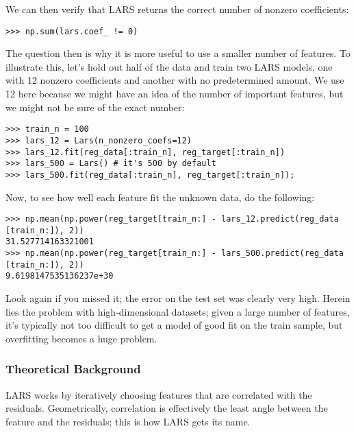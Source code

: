 \documentclass[SKL-MASTER.tex]{subfiles}
\begin{document}
We can then verify that LARS returns the correct number of nonzero coefficients:
\begin{framed}
	\begin{verbatim}
>>> np.sum(lars.coef_ != 0)
\end{verbatim}
\end{framed}
The question then is why it is more useful to use a smaller number of features. To illustrate
this, let's hold out half of the data and train two LARS models, one with 12 nonzero
coefficients and another with no predetermined amount. We use 12 here because we might
have an idea of the number of important features, but we might not be sure of the exact
number:
\begin{framed}
\begin{verbatim}
>>> train_n = 100
>>> lars_12 = Lars(n_nonzero_coefs=12)
>>> lars_12.fit(reg_data[:train_n], reg_target[:train_n])
>>> lars_500 = Lars() # it's 500 by default
>>> lars_500.fit(reg_data[:train_n], reg_target[:train_n]);
\end{verbatim}
\end{framed}
Now, to see how well each feature fit the unknown data, do the following:
\begin{framed}
\begin{verbatim}
>>> np.mean(np.power(reg_target[train_n:] - lars_12.predict(reg_data
[train_n:]), 2))
31.527714163321001
>>> np.mean(np.power(reg_target[train_n:] - lars_500.predict(reg_data
[train_n:]), 2))
9.6198147535136237e+30
\end{verbatim}
\end{framed}
Look again if you missed it; the error on the test set was clearly very high. Herein lies the
problem with high-dimensional datasets; given a large number of features, it's typically
not too difficult to get a model of good fit on the train sample, but overfitting becomes
a huge problem.
\subsubsection{Theoretical Background}
LARS works by iteratively choosing features that are correlated with the residuals. Geometrically,
correlation is effectively the least angle between the feature and the residuals; this is how LARS
gets its name.
\end{document}
